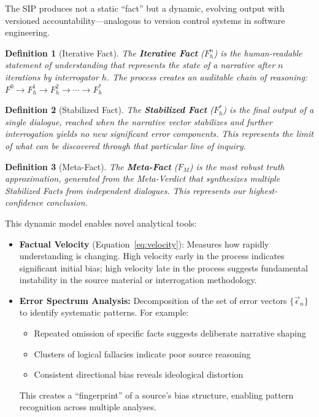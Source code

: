 \documentclass[11pt,a4paper]{article}
\newtheorem{definition}{Definition}[section]
\begin{document}
The SIP produces not a static ``fact'' but a dynamic, evolving output with versioned accountability---analogous to version control systems in software engineering.

\begin{definition}[Iterative Fact]
The \textbf{Iterative Fact} ($F_h^n$) is the human-readable statement of understanding that represents the state of a narrative after $n$ iterations by interrogator $h$. The process creates an auditable chain of reasoning: 
$F^0 \to F_h^1 \to F_h^2 \to \cdots \to F_h^*$
\end{definition}

\begin{definition}[Stabilized Fact]
The \textbf{Stabilized Fact} ($F_h^*$) is the final output of a single dialogue, reached when the narrative vector stabilizes and further interrogation yields no new significant error components. This represents the limit of what can be discovered through that particular line of inquiry.
\end{definition}

\begin{definition}[Meta-Fact]
The \textbf{Meta-Fact} ($F_M$) is the most robust truth approximation, generated from the Meta-Verdict that synthesizes multiple Stabilized Facts from independent dialogues. This represents our highest-confidence conclusion.
\end{definition}

This dynamic model enables novel analytical tools:

\begin{itemize}[leftmargin=*]
    \item \textbf{Factual Velocity} (Equation~\ref{eq:velocity}): Measures how rapidly understanding is changing. High velocity early in the process indicates significant initial bias; high velocity late in the process suggests fundamental instability in the source material or interrogation methodology.
    
    \item \textbf{Error Spectrum Analysis:} Decomposition of the set of error vectors $\{\vec{\epsilon}_n\}$ to identify systematic patterns. For example:
    \begin{itemize}[nosep]
        \item Repeated omission of specific facts suggests deliberate narrative shaping
        \item Clusters of logical fallacies indicate poor source reasoning
        \item Consistent directional bias reveals ideological distortion
    \end{itemize}
    This creates a ``fingerprint'' of a source's bias structure, enabling pattern recognition across multiple analyses.
\end{itemize}
\end{document}
